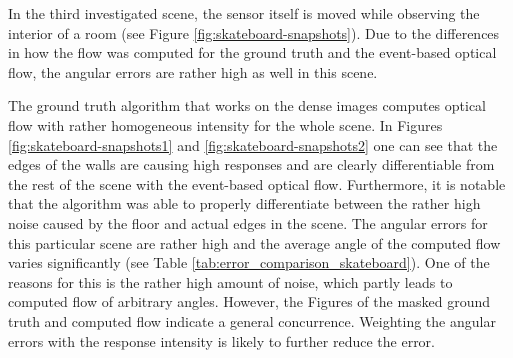In the third investigated scene, the sensor itself is moved while observing the interior of a room (see Figure \ref{fig:skateboard-snapshots}). 
Due to the differences in how the flow was computed for the ground truth and the event-based optical flow, the angular errors are rather high as well in this scene.

The ground truth algorithm that works on the dense images computes optical flow with rather homogeneous intensity for the whole scene.
In Figures \ref{fig:skateboard-snapshots1} and \ref{fig:skateboard-snapshots2} one can see that the edges of the walls are causing high responses and are clearly differentiable from the rest of the scene with the event-based optical flow.
Furthermore, it is notable that the algorithm was able to properly differentiate between the rather high noise caused by the floor and actual edges in the scene.
The angular errors for this particular scene are rather high and the average angle of the computed flow varies significantly (see Table \ref{tab:error_comparison_skateboard}). 
One of the reasons for this is the rather high amount of noise, which partly leads to computed flow of arbitrary angles.
However, the Figures of the masked ground truth and computed flow indicate a general concurrence.
Weighting the angular errors with the response intensity is likely to further reduce the error.


